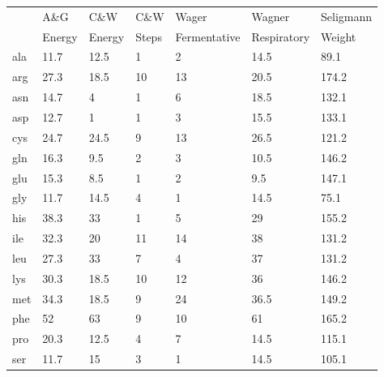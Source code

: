 


\begin{table}
\begin{footnotesize}
  \begin{tabular}{ p{1cm} *{6}{p{1.9cm}} }
                                                                                \toprule
          & A\&G   & C\&W   & C\&W  & Wager        & Wagner      & Seligmann \\
          & Energy & Energy & Steps & Fermentative & Respiratory & Weight    \\ \midrule
      ala & 11.7   & 12.5   & 1     & 2            & 14.5        & 89.1      \\
      arg & 27.3   & 18.5   & 10    & 13           & 20.5        & 174.2     \\
      asn & 14.7   & 4      & 1     & 6            & 18.5        & 132.1     \\
      asp & 12.7   & 1      & 1     & 3            & 15.5        & 133.1     \\
      cys & 24.7   & 24.5   & 9     & 13           & 26.5        & 121.2     \\
      gln & 16.3   & 9.5    & 2     & 3            & 10.5        & 146.2     \\
      glu & 15.3   & 8.5    & 1     & 2            & 9.5         & 147.1     \\
      gly & 11.7   & 14.5   & 4     & 1            & 14.5        & 75.1      \\
      his & 38.3   & 33     & 1     & 5            & 29          & 155.2     \\
      ile & 32.3   & 20     & 11    & 14           & 38          & 131.2     \\
      leu & 27.3   & 33     & 7     & 4            & 37          & 131.2     \\
      lys & 30.3   & 18.5   & 10    & 12           & 36          & 146.2     \\
      met & 34.3   & 18.5   & 9     & 24           & 36.5        & 149.2     \\
      phe & 52     & 63     & 9     & 10           & 61          & 165.2     \\
      pro & 20.3   & 12.5   & 4     & 7            & 14.5        & 115.1     \\
      ser & 11.7   & 15     & 3     & 1            & 14.5        & 105.1     \\

\end{tabular}
\end{footnotesize}
\end{table}
